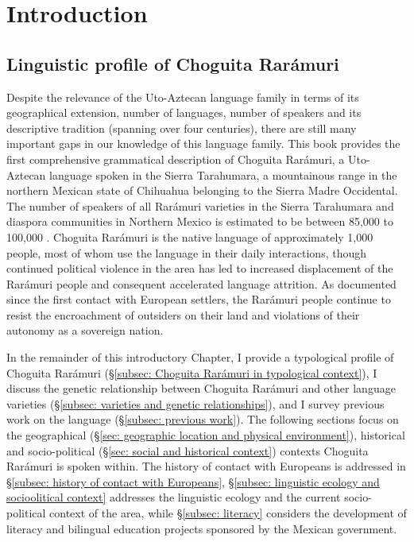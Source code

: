 \chapter{Introduction}
\label{chap: introduction}

\section{Linguistic profile of Choguita Rarámuri}

Despite the relevance of the {Uto-Aztecan} language family in terms of its geographical extension, number of languages, number of speakers and its descriptive tradition (spanning over four centuries), there are still many important gaps in our knowledge of this language family. This book provides the first comprehensive grammatical description of Choguita Rarámuri, a {Uto-Aztecan} language spoken in the Sierra Tarahumara, a mountainous range in the northern Mexican state of Chihuahua belonging to the Sierra Madre Occidental. The number of speakers of all Rarámuri varieties in the Sierra Tarahumara and diaspora communities in Northern Mexico is estimated to be between 85,000 \citep{catalogo2021inali} to 100,000 \citep{embriz2012mexico,merrill2014ralamuli}. Choguita Rarámuri is the native language of approximately 1,000 people, most of whom use the language in their daily interactions, though continued political violence in the area has led to increased displacement of the Rarámuri people and consequent accelerated language attrition. As documented since the first contact with European settlers, the Rarámuri people continue to resist the encroachment of outsiders on their land and violations of their autonomy as a sovereign nation.

In the remainder of this introductory Chapter, I provide a typological profile of Choguita Rarámuri (§\ref{subsec: Choguita Rarámuri in typological context}), I discuss the genetic relationship between Choguita Rarámuri and other language varieties (§\ref{subsec: varieties and genetic relationships}), and I survey previous work on the language (§\ref{subsec: previous work}). The following sections focus on the geographical (§\ref{sec: geographic location and physical environment}), historical and socio-political (§\ref{sec: social and historical context}) contexts Choguita Rarámuri is spoken within. The history of contact with Europeans is addressed in §\ref{subsec: history of contact with Europeans}, §\ref{subsec: linguistic ecology and socioolitical context} addresses the linguistic ecology and the current socio-political context of the area, while §\ref{subsec: literacy} considers the development of literacy and bilingual education projects sponsored by the Mexican government.

